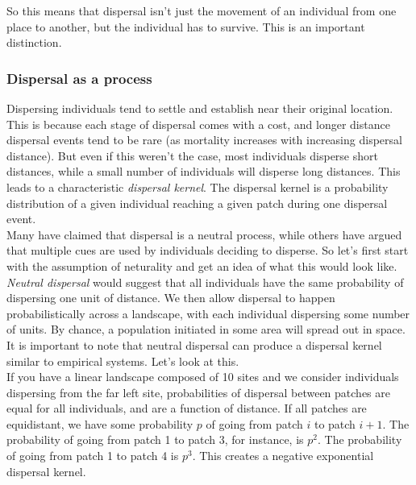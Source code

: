 \documentclass[12pt]{article}
\begin{document}
So this means that dispersal isn't just the movement of an individual from one place to another, but the individual has to survive. This is an important distinction. 












\subsubsection*{Dispersal as a process}

Dispersing individuals tend to settle and establish near their original location. This is because each stage of dispersal comes with a cost, and longer distance dispersal events tend to be rare (as mortality increases with increasing dispersal distance). But even if this weren't the case, most individuals disperse short distances, while a small number of individuals will disperse long distances. This leads to a characteristic \textit{dispersal kernel}. The dispersal kernel is a probability distribution of a given individual reaching a given patch during one dispersal event. \\


Many have claimed that dispersal is a neutral process, while others have argued that multiple cues are used by individuals deciding to disperse. So let's first start with the assumption of neturality and get an idea of what this would look like. \\









\textit{Neutral dispersal} would suggest that all individuals have the same probability of dispersing one unit of distance. We then allow dispersal to happen probabilistically across a landscape, with each individual dispersing some number of units. By chance, a population initiated in some area will spread out in space. It is important to note that neutral dispersal can produce a dispersal kernel similar to empirical systems. Let's look at this. \\


If you have a linear landscape composed of 10 sites and we consider individuals dispersing from the far left site, probabilities of dispersal between patches are equal for all individuals, and are a function of distance. If all patches are equidistant, we have some probability $p$ of going from patch $i$ to patch $i+1$. The probability of going from patch 1 to patch 3, for instance, is $p^{2}$. The probability of going from patch 1 to patch 4 is $p^{3}$. This creates a negative exponential dispersal kernel. \\
\end{document}
